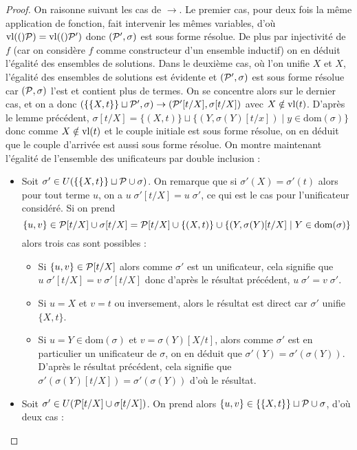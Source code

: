 \begin{proof}
    On raisonne suivant les cas de $\to$. Le premier cas, pour deux fois la même application de fonction, fait intervenir les mêmes variables, d'où $\mathrm{vl}(()\mathcal P)=\mathrm{vl}(()\mathcal P')$ donc $(\mathcal P',\sigma)$ est sous forme résolue. De plus par injectivité de $f$ (car on considère $f$ comme constructeur d'un ensemble inductif) on en déduit l'égalité des ensembles de solutions. Dans le deuxième cas, où l'on unifie $X$ et $X$, l'égalité des ensembles de solutions est évidente et $(\mathcal P',\sigma)$ est sous forme résolue car $(\mathcal P,\sigma)$ l'est et contient plus de termes. On se concentre alors sur le dernier cas, et on a donc $(\{\{X,t\}\}\sqcup \mathcal P',\sigma)\to (\mathcal P'[t/X],\sigma[t/X])$ avec $X\notin\mathrm{vl}(t)$. D'après le lemme précédent, $\sigma[t/X] = \{(X,t)\}\sqcup\{(Y,\sigma(Y)[t/x])\mid y\in\mathrm{dom}(\sigma)\}$ donc comme $X\notin\mathrm{vl}(t)$ et le couple initiale est sous forme résolue, on en déduit que le couple d'arrivée est aussi sous forme résolue. On montre maintenant l'égalité de l'ensemble des unificateurs par double inclusion :
    \begin{itemize}[label=$\bullet$]
        \item Soit $\sigma'\in U(\{\{X,t\}\}\sqcup\mathcal P\cup \sigma)$. On remarque que si $\sigma'(X) = \sigma'(t)$ alors pour tout terme $u$, on a $u\;\sigma' [t/X] = u\;\sigma'$, ce qui est le cas pour l'unificateur considéré. Si on prend $$\{u,v\} \in \mathcal P[t/X]\cup \sigma[t/X] = \mathcal P[t/X] \cup \{(X,t)\}\cup\{(Y,\sigma(Y)[t/X]\mid Y\in\mathrm{dom}(\sigma)\}$$ alors trois cas sont possibles :
        \begin{itemize}[label=$\bullet$]
            \item Si $\{u,v\}\in \mathcal P[t/X]$ alors comme $\sigma'$ est un unificateur, cela signifie que $u\;\sigma' [t/X] = v\;\sigma' [t/X]$ donc d'après le résultat précédent, $u\;\sigma' = v\;\sigma'$.
            \item Si $u=X$ et $v=t$ ou inversement, alors le résultat est direct car $\sigma'$ unifie $\{X,t\}$.
            \item Si $u = Y\in\mathrm{dom}(\sigma)$ et $v = \sigma(Y)[X/t]$, alors comme $\sigma'$ est en particulier un unificateur de $\sigma$, on en déduit que $\sigma'(Y) = \sigma'(\sigma(Y))$. D'après le résultat précédent, cela signifie que $\sigma'(\sigma(Y)[t/X]) = \sigma'(\sigma(Y))$ d'où le résultat.
        \end{itemize}
        \item Soit $\sigma' \in U(\mathcal P[t/X]\cup \sigma[t/X])$. On prend alors $\{u,v\} \in \{\{X,t\}\}\sqcup \mathcal P\cup \sigma$, d'où deux cas :

\end{itemize}
\end{proof}
